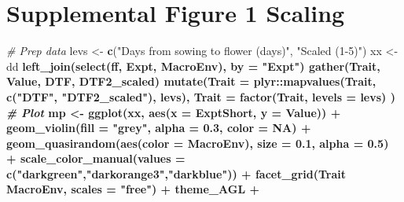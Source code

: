 \documentclass[
]{article}
\newenvironment{Shaded}{\begin{snugshade}}{\end{snugshade}}
\newcommand{\CommentTok}[1]{\textcolor[rgb]{0.56,0.35,0.01}{\textit{#1}}}
\newcommand{\DataTypeTok}[1]{\textcolor[rgb]{0.13,0.29,0.53}{#1}}
\newcommand{\FloatTok}[1]{\textcolor[rgb]{0.00,0.00,0.81}{#1}}
\newcommand{\KeywordTok}[1]{\textcolor[rgb]{0.13,0.29,0.53}{\textbf{#1}}}
\newcommand{\NormalTok}[1]{#1}
\newcommand{\OperatorTok}[1]{\textcolor[rgb]{0.81,0.36,0.00}{\textbf{#1}}}
\newcommand{\OtherTok}[1]{\textcolor[rgb]{0.56,0.35,0.01}{#1}}
\newcommand{\StringTok}[1]{\textcolor[rgb]{0.31,0.60,0.02}{#1}}
\begin{document}
\hypertarget{supplemental-figure-1-scaling}{%
\section{Supplemental Figure 1
Scaling}\label{supplemental-figure-1-scaling}}

\begin{Shaded}
\begin{Highlighting}[]
\CommentTok{# Prep data}
\NormalTok{levs <-}\StringTok{ }\KeywordTok{c}\NormalTok{(}\StringTok{"Days from sowing to flower (days)"}\NormalTok{, }\StringTok{"Scaled (1-5)"}\NormalTok{)}
\NormalTok{xx <-}\StringTok{ }\NormalTok{dd }\OperatorTok{%
\StringTok{  }\KeywordTok{left_join}\NormalTok{(}\KeywordTok{select}\NormalTok{(ff, Expt, MacroEnv), }\DataTypeTok{by =} \StringTok{"Expt"}\NormalTok{) }\OperatorTok{%
\StringTok{  }\KeywordTok{gather}\NormalTok{(Trait, Value, DTF, DTF2_scaled) }\OperatorTok{%
\StringTok{  }\KeywordTok{mutate}\NormalTok{(}\DataTypeTok{Trait =}\NormalTok{ plyr}\OperatorTok{::}\KeywordTok{mapvalues}\NormalTok{(Trait, }\KeywordTok{c}\NormalTok{(}\StringTok{"DTF"}\NormalTok{, }\StringTok{"DTF2_scaled"}\NormalTok{), levs),}
         \DataTypeTok{Trait =} \KeywordTok{factor}\NormalTok{(Trait, }\DataTypeTok{levels =}\NormalTok{ levs) )}
\CommentTok{# Plot}
\NormalTok{mp <-}\StringTok{ }\KeywordTok{ggplot}\NormalTok{(xx, }\KeywordTok{aes}\NormalTok{(}\DataTypeTok{x =}\NormalTok{ ExptShort, }\DataTypeTok{y =}\NormalTok{ Value)) }\OperatorTok{+}\StringTok{ }
\StringTok{  }\KeywordTok{geom_violin}\NormalTok{(}\DataTypeTok{fill =} \StringTok{"grey"}\NormalTok{, }\DataTypeTok{alpha =} \FloatTok{0.3}\NormalTok{, }\DataTypeTok{color =} \OtherTok{NA}\NormalTok{) }\OperatorTok{+}\StringTok{ }
\StringTok{  }\KeywordTok{geom_quasirandom}\NormalTok{(}\KeywordTok{aes}\NormalTok{(}\DataTypeTok{color =}\NormalTok{ MacroEnv), }\DataTypeTok{size =} \FloatTok{0.1}\NormalTok{, }\DataTypeTok{alpha =} \FloatTok{0.5}\NormalTok{) }\OperatorTok{+}
\StringTok{  }\KeywordTok{scale_color_manual}\NormalTok{(}\DataTypeTok{values =} \KeywordTok{c}\NormalTok{(}\StringTok{"darkgreen"}\NormalTok{,}\StringTok{"darkorange3"}\NormalTok{,}\StringTok{"darkblue"}\NormalTok{)) }\OperatorTok{+}
\StringTok{  }\KeywordTok{facet_grid}\NormalTok{(Trait }\OperatorTok{~}\StringTok{ }\NormalTok{MacroEnv, }\DataTypeTok{scales =} \StringTok{"free"}\NormalTok{) }\OperatorTok{+}\StringTok{ }
\StringTok{  }\NormalTok{theme_AGL }\OperatorTok{+}\StringTok{ }
}}}
\end{Highlighting}
\end{Shaded}
\end{document}

